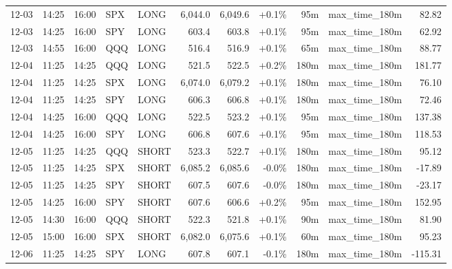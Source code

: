 \documentclass[11pt,a4paper,twoside]{article}
\begin{document}
\begin{center}
\begin{longtable}{>{\color{txtmain}}l l l l l r r r r >{\color{txtmain}}l r}
12-03 & 14:25 & 16:00 & SPX & LONG & 6,044.0 & 6,049.6 & \textcolor{wingreen}{+0.1\%} & 95m & max\_time\_180m & \textcolor{wingreen}{82.82} \\
12-03 & 14:25 & 16:00 & SPY & LONG & 603.4 & 603.8 & \textcolor{wingreen}{+0.1\%} & 95m & max\_time\_180m & \textcolor{wingreen}{62.92} \\
12-03 & 14:55 & 16:00 & QQQ & LONG & 516.4 & 516.9 & \textcolor{wingreen}{+0.1\%} & 65m & max\_time\_180m & \textcolor{wingreen}{88.77} \\
12-04 & 11:25 & 14:25 & QQQ & LONG & 521.5 & 522.5 & \textcolor{wingreen}{+0.2\%} & 180m & max\_time\_180m & \textcolor{wingreen}{181.77} \\
12-04 & 11:25 & 14:25 & SPX & LONG & 6,074.0 & 6,079.2 & \textcolor{wingreen}{+0.1\%} & 180m & max\_time\_180m & \textcolor{wingreen}{76.10} \\
12-04 & 11:25 & 14:25 & SPY & LONG & 606.3 & 606.8 & \textcolor{wingreen}{+0.1\%} & 180m & max\_time\_180m & \textcolor{wingreen}{72.46} \\
12-04 & 14:25 & 16:00 & QQQ & LONG & 522.5 & 523.2 & \textcolor{wingreen}{+0.1\%} & 95m & max\_time\_180m & \textcolor{wingreen}{137.38} \\
12-04 & 14:25 & 16:00 & SPY & LONG & 606.8 & 607.6 & \textcolor{wingreen}{+0.1\%} & 95m & max\_time\_180m & \textcolor{wingreen}{118.53} \\
12-05 & 11:25 & 14:25 & QQQ & SHORT & 523.3 & 522.7 & \textcolor{wingreen}{+0.1\%} & 180m & max\_time\_180m & \textcolor{wingreen}{95.12} \\
12-05 & 11:25 & 14:25 & SPX & SHORT & 6,085.2 & 6,085.6 & \textcolor{lossred}{-0.0\%} & 180m & max\_time\_180m & \textcolor{lossred}{-17.89} \\
12-05 & 11:25 & 14:25 & SPY & SHORT & 607.5 & 607.6 & \textcolor{lossred}{-0.0\%} & 180m & max\_time\_180m & \textcolor{lossred}{-23.17} \\
12-05 & 14:25 & 16:00 & SPY & SHORT & 607.6 & 606.6 & \textcolor{wingreen}{+0.2\%} & 95m & max\_time\_180m & \textcolor{wingreen}{152.95} \\
12-05 & 14:30 & 16:00 & QQQ & SHORT & 522.3 & 521.8 & \textcolor{wingreen}{+0.1\%} & 90m & max\_time\_180m & \textcolor{wingreen}{81.90} \\
12-05 & 15:00 & 16:00 & SPX & SHORT & 6,082.0 & 6,075.6 & \textcolor{wingreen}{+0.1\%} & 60m & max\_time\_180m & \textcolor{wingreen}{95.23} \\
12-06 & 11:25 & 14:25 & SPY & LONG & 607.8 & 607.1 & \textcolor{lossred}{-0.1\%} & 180m & max\_time\_180m & \textcolor{lossred}{-115.31} \\

\end{longtable}
\end{center}
\end{document}
